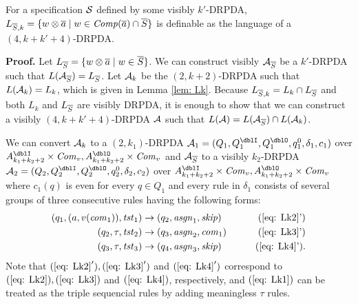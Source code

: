 \begin{lemma}\label{lem: LkS}
For a specification ${\cal S}$ defined by some visibly $k'$-DRPDA,
$L_{{\overline{S}}, k} = \{w\otimes{\overline{a}} \mid w\in{\mathit{Comp}}({\overline{a}})\cap {\overline{S}}\}$
is definable as the language of a $(4,k+k'+4)$-DRPDA.
\end{lemma}
{\bf Proof.}\quad
Let $L_{{\overline{S}}} = \{w\otimes{\overline{a}}\mid w\in{\overline{S}}\}$.
We can construct visibly ${\cal A}_{{\overline{S}}}$ be a $k'$-DRPDA such that $L({\cal A}_{{\overline{S}}})= L_{{\overline{S}}}$.
Let ${\cal A}_k$ be the $(2,k+2)$-DRPDA
such that $L({\cal A}_k)=L_k$, which is given in Lemma \ref{lem: Lk}.
Because $L_{{\overline{S}}, k} = L_k \cap L_{{\overline{S}}}$ and both $L_k$ and $L_{{\overline{S}}}$ are
visibly DRPDA, it is enough to show that we can construct a visibly $(4,k+k'+4)$-DRPDA ${\cal A}$ such that $L({\cal A})=L({\cal A}_{{\overline{S}}})\cap L({\cal A}_k)$.

We can convert ${\cal A}_k$ to a $(2,k_1)$-DRPDA $\calA_1=(Q_1, Q^\dblI_1, Q^\dblO_1, q^0_1, \delta_1, c_1)$
over $A^\dblI_{k_1+k_2+2}\times\Com_v,A^\dblO_{k_1+k_2+2}\times\Com_v$
and ${\cal A}_{{\overline{S}}}$ to a visibly $k_2$-DRPDA $\calA_2=(Q_2, Q^\dblI_2, Q^\dblO_2, q^0_2, \delta_2, c_2)$
over $A^\dblI_{k_1+k_2+2}\times\Com_v,A^\dblO_{k_1+k_2+2}\times\Com_v$ where
$c_1(q)$ is even for every $q\in Q_1$ and
every rule in $\delta_1$
consists of several groups of three consecutive rules having the following forms:
\begin{align}
(q_1, (a,v(\com_1)), \tst_1) &\to (q_2,\asgn_1, \skip)& \tag{\ref{eq: Lk2}'}\\
(q_2, \tau, \tst_2) &\to (q_3,\asgn_2, \com_1)& \tag{\ref{eq: Lk3}'}\\
(q_3, \tau, \tst_3) &\to (q_4,\asgn_3, \skip)& \tag{\ref{eq: Lk4}'}.
\end{align}
Note that $(\ref{eq: Lk2}'), (\ref{eq: Lk3}')$ and $(\ref{eq: Lk4}')$ correspond to $(\ref{eq: Lk2}), (\ref{eq: Lk3})$ and $(\ref{eq: Lk4})$, respectively, and $(\ref{eq: Lk1})$ can be treated as the triple sequencial rules by adding meaningless $\tau$ rules.

